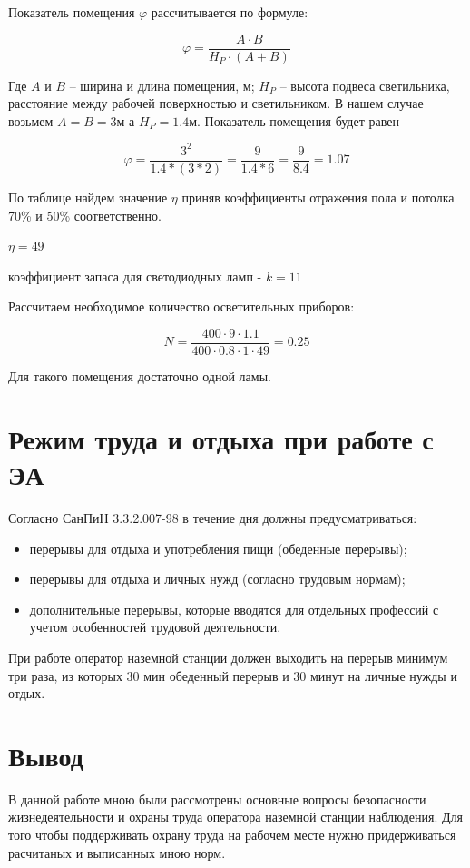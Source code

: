\documentclass[a4paper,12pt]{report} %
\begin{document}
Показатель помещения $\varphi$ рассчитывается по формуле:

\[
\varphi = \frac{A \cdot B}{H_{P} \cdot (A + B)}
\]

Где $A$ и $B$ -- ширина и длина помещения, м; $H_{P}$ -- высота подвеса
светильника, расстояние между рабочей поверхностью и светильником. В нашем
случае возьмем $A = B = 3\text{м}$ а $H_{P} = 1.4\text{м}$. Показатель помещения
будет равен 

\[
\varphi = \frac{3^2}{1.4*(3*2)} = \frac{9}{1.4*6} = \frac{9}{8.4} = 1.07
\]

По таблице \cite{ledcoef} найдем значение $\eta$ приняв коэффициенты отражения
пола и потолка 70\% и 50\% соответственно.

$\eta = 49$

коэффициент запаса для светодиодных ламп - $k = 11$\cite{ledcoef2}

Рассчитаем необходимое количество осветительных приборов:

\[
N = \frac{ 400 \cdot 9 \cdot 1.1 }{ 400 \cdot 0.8 \cdot 1 \cdot 49 } = 0.25
\]

Для такого помещения достаточно одной ламы.
\section{Режим труда и отдыха при работе с ЭА}

Согласно СанПиН 3.3.2.007-98 в течение дня должны предусматриваться:

\begin{itemize}
\item перерывы для отдыха и употребления пищи (обеденные перерывы);
\item перерывы для отдыха и личных нужд (согласно трудовым нормам);
\item дополнительные перерывы, которые вводятся для отдельных профессий с учетом особенностей трудовой деятельности.
\end{itemize}

При работе оператор наземной станции должен выходить на перерыв минимум три
раза, из которых 30 мин обеденный перерыв и 30 минут на личные нужды и отдых.

\section{Вывод}

В данной работе мною были рассмотрены основные вопросы безопасности
жизнедеятельности и охраны труда оператора наземной станции наблюдения. Для того
чтобы поддерживать охрану труда на рабочем месте нужно придерживаться расчитаных
и выписанных мною норм.
\newpage
\end{document}
